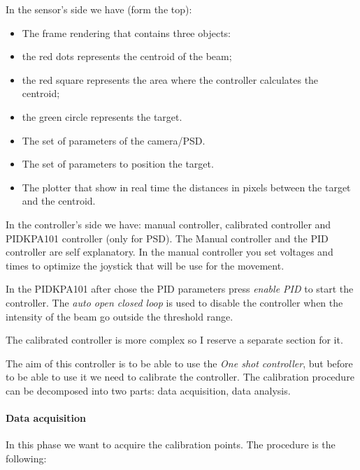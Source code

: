 In the sensor's side we have (form the top):

\begin{itemize}
  \itemsep1pt\parskip0pt
  \item
        The frame rendering that contains three objects:
  \item
        the red dots represents the centroid of the beam;
  \item
        the red square represents the area where the controller calculates the
        centroid;
  \item
        the green circle represents the target.
  \item
        The set of parameters of the camera/PSD.
  \item
        The set of parameters to position the target.
  \item
        The plotter that show in real time the distances in pixels between the
        target and the centroid.
\end{itemize}

In the controller's side we have: manual controller, calibrated
controller and PIDKPA101 controller (only for PSD). The Manual
controller and the PID controller are self explanatory. In the manual
controller you set voltages and times to optimize the joystick that will
be use for the movement.

In the PIDKPA101 after chose the PID parameters press \emph{enable PID}
to start the controller. The \emph{auto open closed loop} is used to
disable the controller when the intensity of the beam go outside the
threshold range.

The calibrated controller is more complex so I reserve a separate
section for it.



The aim of this controller is to be able to use the \emph{One shot
  controller}, but before to be able to use it we need to calibrate the
controller. The calibration procedure can be decomposed into two parts:
data acquisition, data analysis.

\paragraph{Data acquisition}

In this phase we want to acquire the calibration points. The procedure
is the following:

